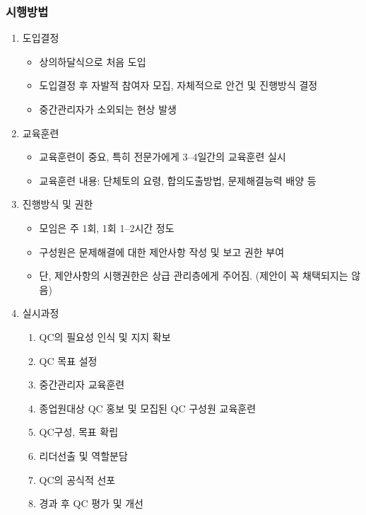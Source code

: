 \documentclass[aspectratio=169,xcolor=dvipsnames,handout]{beamer}
\begin{document}
\begin{frame}[allowframebreaks]
    \frametitle{시행방법}
    \begin{enumerate}[<+->]
        \item 도입결정
        \begin{itemize}[<+->]
            \item 상의하달식으로 처음 도입
            \item 도입결정 후 자발적 참여자 모집, 자체적으로 안건 및 진행방식 결정
            \item 중간관리자가 소외되는 현상 발생
        \end{itemize}
        \item 교육훈련
        \begin{itemize}[<+->]
            \item 교육훈련이 중요, 특히 전문가에게 3--4일간의 교육훈련 실시
            \item 교육훈련 내용: 단체토의 요령, 합의도출방법, 문제해결능력 배양 등
        \end{itemize}
        \item 진행방식 및 권한
        \begin{itemize}[<+->]
            \item 모임은 주 1회, 1회 1--2시간 정도
            \item 구성원은 문제해결에 대한 제안사항 작성 및 보고 권한 부여
            \item 단, 제안사항의 시행권한은 상급 관리층에게 주어짐. (제안이 꼭 채택되지는 않음)
        \end{itemize}
    \framebreak\relax
        \item 실시과정
        \begin{enumerate}[<+->]
            \item QC의 필요성 인식 및 지지 확보
            \item QC 목표 설정
            \item 중간관리자 교육훈련
            \item 종업원대상 QC 홍보 및 모집된 QC 구성원 교육훈련
            \item QC구성, 목표 확립
            \item 리더선출 및 역할분담
            \item QC의 공식적 선포
            \item 경과 후 QC 평가 및 개선
        \end{enumerate}
    \end{enumerate}
\end{frame}
\end{document}

